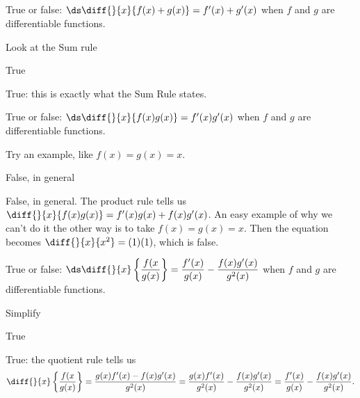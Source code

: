 %
%
\subsection*{\Conceptual}



\begin{question}True or false: $\ds\diff{}{x}\{f(x)+g(x)\}=f'(x)+g'(x)$ when $f$ and $g$ are differentiable functions.
\end{question}
\begin{hint} Look at the Sum rule
\end{hint}
\begin{answer} True
\end{answer}
\begin{solution} True: this is exactly what the Sum Rule states.
\end{solution}


\begin{question}
True or false: $\ds\diff{}{x}\{f(x)g(x)\}=f'(x)g'(x)$ when $f$ and $g$ are differentiable functions.
\end{question}
\begin{hint} Try an example, like $f(x)=g(x)=x$.
\end{hint}
\begin{answer} False, in general
\end{answer}
\begin{solution} False, in general. The product rule tells us $\diff{}{x}\{f(x)g(x)\}=f'(x)g(x)+f(x)g'(x)$. An easy example of why we can't do it the other way is to take $f(x)=g(x)=x$. Then the equation becomes $\diff{}{x}\{x^2\}=(1)(1)$, which is false.
\end{solution}


\begin{question}True or false: $\ds\diff{}{x}\left\{\dfrac{f(x}{g(x)}\right\}=\dfrac{f'(x)}{g(x)}-\dfrac{f(x)g'(x)}{g^2(x)}$ when $f$ and $g$ are differentiable functions.
\end{question}
\begin{hint} Simplify
\end{hint}
\begin{answer} True
\end{answer}
\begin{solution} True: the quotient rule tells us \[\diff{}{x}\left\{\frac{f(x}{g(x)}\right\}=\frac{g(x)f'(x)-f(x)g'(x)}{g^2(x)} = \frac{g(x)f'(x)}{g^2(x)}-\frac{f(x)g'(x)}{g^2(x)} = \frac{f'(x)}{g(x)}-\frac{f(x)g'(x)}{g^2(x)}.\]
\end{solution}


